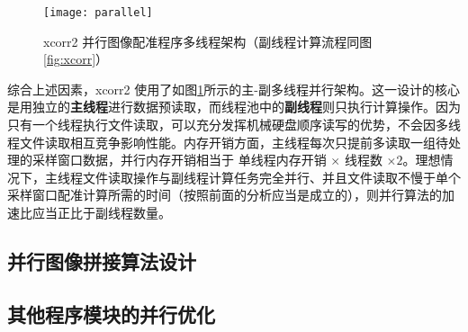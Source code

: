 \begin{figure}[ht]
\centering
\texttt{[image: parallel]}
\caption{xcorr2 并行图像配准程序多线程架构（副线程计算流程同图\ref{fig:xcorr}）} \label{fig:parallel}
\end{figure}

综合上述因素，xcorr2 使用了如图\ref{fig:parallel}所示的主-副多线程并行架构。这一设计的核心是用独立的\textbf{主线程}进行数据预读取，而线程池中的\textbf{副线程}则只执行计算操作。因为只有一个线程执行文件读取，可以充分发挥机械硬盘顺序读写的优势，不会因多线程文件读取相互竞争影响性能。内存开销方面，主线程每次只提前多读取一组待处理的采样窗口数据，并行内存开销相当于 单线程内存开销 $\times$ 线程数 $\times 2$。理想情况下，主线程文件读取操作与副线程计算任务完全并行、并且文件读取不慢于单个采样窗口配准计算所需的时间（按照前面的分析应当是成立的），则并行算法的加速比应当正比于副线程数量。


\subsection{并行图像拼接算法设计}

\subsection{其他程序模块的并行优化}
